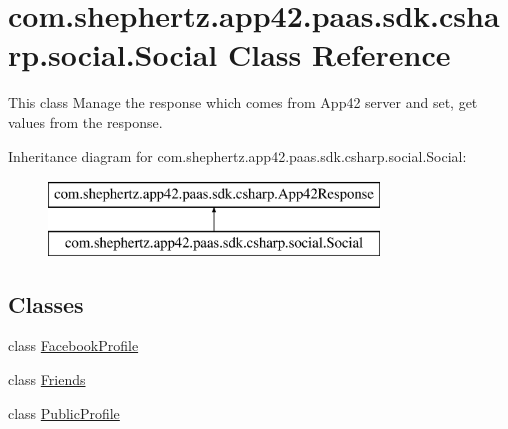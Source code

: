 \hypertarget{classcom_1_1shephertz_1_1app42_1_1paas_1_1sdk_1_1csharp_1_1social_1_1_social}{\section{com.\+shephertz.\+app42.\+paas.\+sdk.\+csharp.\+social.\+Social Class Reference}
\label{classcom_1_1shephertz_1_1app42_1_1paas_1_1sdk_1_1csharp_1_1social_1_1_social}
}


This class Manage the response which comes from App42 server and set, get values from the response.  


Inheritance diagram for com.\+shephertz.\+app42.\+paas.\+sdk.\+csharp.\+social.\+Social\+:\begin{figure}[H]
\begin{center}
\leavevmode
\includegraphics[height=2.000000cm]{classcom_1_1shephertz_1_1app42_1_1paas_1_1sdk_1_1csharp_1_1social_1_1_social}
\end{center}
\end{figure}
\subsection*{Classes}
\begin{DoxyCompactItemize}
\item 
class \hyperlink{classcom_1_1shephertz_1_1app42_1_1paas_1_1sdk_1_1csharp_1_1social_1_1_social_1_1_facebook_profile}{Facebook\+Profile}
\item 
class \hyperlink{classcom_1_1shephertz_1_1app42_1_1paas_1_1sdk_1_1csharp_1_1social_1_1_social_1_1_friends}{Friends}
\item 
class \hyperlink{classcom_1_1shephertz_1_1app42_1_1paas_1_1sdk_1_1csharp_1_1social_1_1_social_1_1_public_profile}{Public\+Profile}
\end{DoxyCompactItemize}
